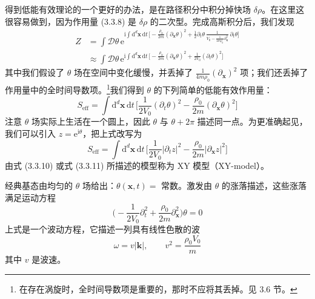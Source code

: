 得到低能有效理论的一个更好的办法，是在路径积分中积分掉快场 $\delta\rho$。在这里这很容易做到，因为作用量 (3.3.8) 是 $\delta\rho$ 的二次型。完成高斯积分后，我们发现
\begin{align*}
Z &= \int \mathcal{D}\theta\,\mathrm{e}^{\mathrm{i}\int \mathrm{d}^d\pmb{x}\,\mathrm{d}t\,\big[-\frac{\rho_0}{2m}(\partial_{\pmb{x}}\theta)^2 + \frac{1}{2}\partial_t\theta\,\frac{1}{V_0 - \frac{1}{4m\rho_0}\partial_{\pmb{x}}^2}\,\partial_t\theta\big]}\\
&\approx \int \mathcal{D}\theta\,\mathrm{e}^{\mathrm{i}\int \mathrm{d}^d\pmb{x}\,\mathrm{d}t\,\big[-\frac{\rho_0}{2m}(\partial_{\pmb{x}}\theta)^2 + \frac{1}{2V_0}(\partial_t\theta)^2\big]}\tag{3.3.9}
\end{align*}
其中我们假设了 $\theta$ 场在空间中变化缓慢，并丢掉了 $\frac{1}{4m\rho_0}(\partial_{\pmb{x}})^2$ 项；我们还丢掉了作用量中的全时间导数项。\footnote{在存在涡旋时，全时间导数项是重要的，那时不应将其丢掉。见 3.6 节。}我们得到 $\theta$ 的下列简单的低能有效作用量：
\begin{equation*}
S_{\mathrm{eff}} = \int \mathrm{d}^d\pmb{x}\,\mathrm{d}t\,\Big[\frac{1}{2V_0}(\partial_t\theta)^2 - \frac{\rho_0}{2m}(\partial_{\pmb{x}}\theta)^2\Big]\tag{3.3.10}
\end{equation*}
注意 $\theta$ 场实际上生活在一个圆上，因此 $\theta$ 与 $\theta + 2\pi$ 描述同一点。为更准确起见，我们可以引入 $z = \mathrm{e}^{\mathrm{i}\theta}$，把上式改写为
\begin{equation*}
S_{\mathrm{eff}} = \int \mathrm{d}^d\pmb{x}\,\mathrm{d}t\,\Big[\frac{1}{2V_0}|\partial_t z|^2 - \frac{\rho_0}{2m}|\partial_{\pmb{x}} z|^2\Big]\tag{3.3.11}
\end{equation*}
由式 (3.3.10) 或式 (3.3.11) 所描述的模型称为 XY 模型（XY-model）。

经典基态由均匀的 $\theta$ 场给出：$\theta(\pmb{x},t) = $ 常数。激发由 $\theta$ 的涨落描述，这些涨落满足运动方程
\begin{equation*}
\Big(-\frac{1}{2V_0}\partial_t^2 + \frac{\rho_0}{2m}\partial_{\pmb{x}}^2\Big)\theta = 0
\end{equation*}
上式是一个波动方程，它描述一列具有线性色散的波
\begin{equation*}
\omega = v|\pmb{k}|,\qquad v^2 = \frac{\rho_0 V_0}{m}\tag{3.3.12}
\end{equation*}
其中 $v$ 是波速。

